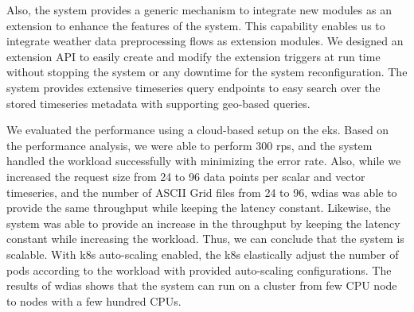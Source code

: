 Also, the system provides a generic mechanism to integrate new modules as an extension to enhance the features of the system. This capability enables us to integrate weather data preprocessing flows as extension modules.
We designed an extension API to easily create and modify the extension triggers at run time without stopping the system or any downtime for the system reconfiguration. The system provides extensive timeseries query endpoints to easy search over the stored timeseries metadata with supporting geo-based queries.

We evaluated the performance using a cloud-based setup on the \acrfull{eks}.
Based on the performance analysis, we were able to perform 300 \acrshort{rps}, and the system handled the workload successfully with minimizing the error rate. Also, while we increased the request size from 24 to 96 data points per scalar and vector timeseries, and the number of ASCII Grid files from 24 to 96, \acrshort{wdias} was able to provide the same throughput while keeping the latency constant. Likewise, the system was able to provide an increase in the throughput by keeping the latency constant while increasing the workload. Thus, we can conclude that the system is scalable. With \acrshort{k8s} auto-scaling enabled, the \acrshort{k8s} elastically adjust the number of pods according to the workload with provided auto-scaling configurations. The results of \acrshort{wdias} shows that the system can run on a cluster from few CPU node to nodes with a few hundred CPUs.
